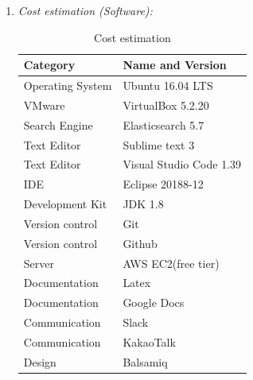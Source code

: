 \documentclass[conference]{IEEEtran}
\begin{document}
\begin{enumerate}
  \item \textit{Cost estimation (Software): } 
  \begin{table}[htbp]
  \renewcommand{\arraystretch}{1.5}
\caption{Cost estimation}
\begin{center}
\begin{tabular}{|p{3cm}|p{4.7cm}|}
\hline
\textbf{Category         } & \textbf{Name and Version        }\\
\hline
Operating System &Ubuntu  16.04 LTS \\
\hline
VMware & VirtualBox 5.2.20 \\
\hline
Search Engine & Elasticsearch 5.7 \\
\hline
Text Editor & Sublime text 3 \\
\hline
Text Editor & Visual Studio Code 1.39  \\
\hline
IDE & Eclipse 20188-12 \\
\hline
Development Kit & JDK 1.8 \\
\hline
Version control & Git \\
\hline
Version control & Github \\
\hline
Server & AWS EC2(free tier)\\
\hline
Documentation & Latex\\
\hline
Documentation & Google Docs\\
\hline
Communication & Slack\\
\hline
Communication & KakaoTalk\\
\hline
Design & Balsamiq\\
\hline
\end{tabular}
\label{tab1}
\end{center}
\end{table}
\end{enumerate}
\end{document}
